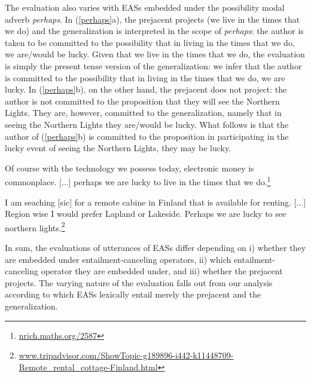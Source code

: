 \documentclass[11pt,fleqn]{article}
\newcommand{\6}{\mbox{$[\hspace*{-.6mm}[$}}
\newcommand{\9}{\mbox{$]\hspace*{-.6mm}]$}}
\begin{document}
The evaluation also varies with EASs embedded under the possibility modal adverb {\em perhaps}. In (\ref{perhaps}a), the prejacent projects (we live in the times that we do) and the generalization is interpreted in the scope of {\em perhaps}: the author is taken to be committed to the possibility that in living in the times that we do, we are/would be lucky. Given that we live in the times that we do, the evaluation is simply the present tense version of the generalization: we infer that the author is committed to the possibility that in living in the times that we do, we are lucky. In (\ref{perhaps}b), on the other hand, the prejacent does not project: the author is not committed to the proposition that they will see the Northern Lights. They are, however, committed to the generalization, namely that in seeing the Northern Lights they are/would be lucky. What follows is that the author of (\ref{perhaps}b) is committed to the proposition in participating in the lucky event of seeing the Northern Lights, they may be lucky.

\begin{exe}
\ex\label{perhaps}

\begin{xlist}

\ex Of course with the technology we possess today, electronic money is commonplace. [...] perhaps we are lucky to live in the times that we do.\footnote{\url{nrich.maths.org/2587}}

\ex I am seaching [sic] for a remote cabine in Finland that is available for renting. [...]
Region wise I would prefer Lapland or Lakeside. Perhaps we are lucky to see northern lights.\footnote{\url{www.tripadvisor.com/ShowTopic-g189896-i442-k11448709-Remote_rental_cottage-Finland.html}}

\end{xlist}

\end{exe}
In sum, the evaluations of utterances of EASs differ depending on i) whether they are embedded under entailment-canceling operators, ii) which entailment-canceling operator they are embedded under, and iii) whether the prejacent projects. The varying nature of the evaluation falls out from our analysis according to which EASs lexically entail merely the prejacent and the generalization. 
\end{document}
